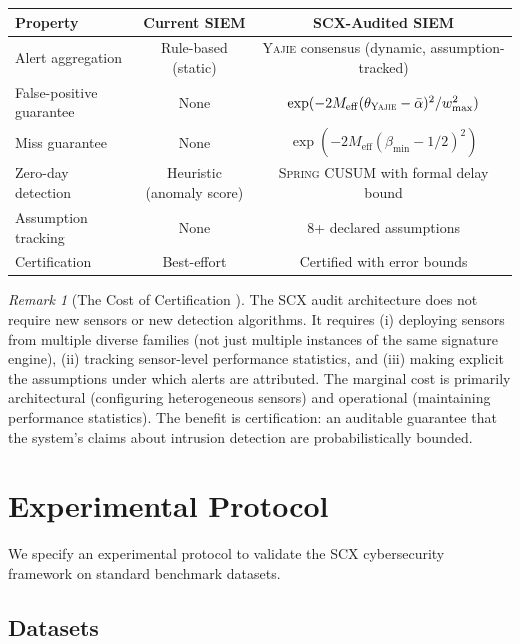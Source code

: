 \documentclass[11pt,a4paper]{article}
\theoremstyle{definition}
\theoremstyle{remark}
\newtheorem{remark}[theorem]{Remark}
\newcommand{\Yajie}{\textsc{Yajie}}
\newcommand{\Spring}{\textsc{Spring}}
\begin{document}
\begin{center}
\begin{tabular}{lcc}
\toprule
\textbf{Property} & \textbf{Current SIEM} & \textbf{SCX-Audited SIEM} \\
\midrule
Alert aggregation & Rule-based (static) & \Yajie{} consensus (dynamic, assumption-tracked) \\
False-positive guarantee & None & $\exp(-2 M_{\mathrm{eff}} (\theta_{\Yajie} - \bar{\alpha})^2 / w_{\max}^2)$ \\
Miss guarantee & None & $\exp(-2 M_{\mathrm{eff}} (\beta_{\min} - 1/2)^2)$ \\
Zero-day detection & Heuristic (anomaly score) & \Spring{} CUSUM with formal delay bound \\
Assumption tracking & None & 8+ declared assumptions \\
Certification & Best-effort & Certified with error bounds \\
\bottomrule
\end{tabular}
\end{center}

\begin{remark}[The Cost of Certification ]
\label{rem:cost}
The SCX audit architecture does not require new sensors or new detection algorithms. It requires (i) deploying sensors from multiple diverse families (not just multiple instances of the same signature engine), (ii) tracking sensor-level performance statistics, and (iii) making explicit the assumptions under which alerts are attributed. The marginal cost is primarily architectural (configuring heterogeneous sensors) and operational (maintaining performance statistics). The benefit is certification: an auditable guarantee that the system's claims about intrusion detection are probabilistically bounded.
\end{remark}

\section{Experimental Protocol }
\label{sec:experiments}

We specify an experimental protocol to validate the SCX cybersecurity framework on standard benchmark datasets.

\subsection{Datasets }
\end{document}
